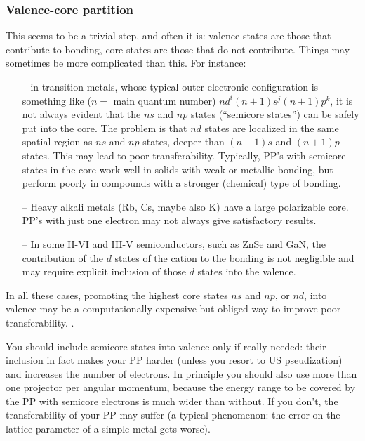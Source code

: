 \documentclass[12pt,a4paper]{article}
\begin{document}
\subsubsection{Valence-core partition}
\label{ValCore}
This seems to be a trivial step, and often it is: valence states 
are those that contribute to bonding, core states are those that 
do not contribute. Things may sometimes be more complicated than 
this. For instance:
\begin{enumerate}
\item[--] in transition metals, whose typical outer electronic
configuration is something like ($n=$ main quantum number)
$nd^i(n+1)s^j(n+1)p^k$, it is not
always evident that the $ns$ and $np$ states (``semicore states'')
can be safely put into the core. The problem is that $nd$ states 
are localized in the same spatial region as $ns$ and $np$ states, 
deeper than $(n+1)s$ and $(n+1)p$ states. This may lead to poor 
transferability. Typically, PP's with semicore states in the core 
work well in solids with weak or metallic bonding, but perform poorly 
in compounds with a stronger (chemical) type of bonding.
\item[--] Heavy alkali metals (Rb, Cs, maybe also K) have a large
polarizable core. PP's with just one electron may not always give
satisfactory results.
\item[--] In some II-VI and III-V semiconductors, such as ZnSe and
GaN, the contribution of the $d$ states of the cation to the bonding 
is not negligible and may require explicit inclusion of those $d$ 
states into the valence.
\end{enumerate}
In all these cases, promoting the highest core states $ns$ and $np$,
or $nd$, into valence may be a computationally
expensive but obliged way to improve poor transferability. . 

You should include semicore states into valence only if really needed:
their inclusion in fact makes your PP harder (unless you resort to 
US pseudization) and increases the number of electrons. In principle 
you should also use more than one projector per angular momentum, 
because the energy range to be covered by the PP with semicore electrons 
is much wider than without. If you don't, the transferability of your PP 
may suffer (a typical phenomenon:
the error on the lattice parameter of a simple metal gets worse).
\end{document}
